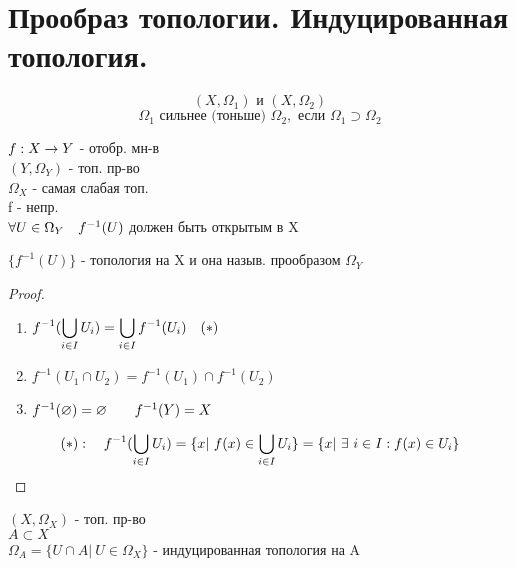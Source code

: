 \documentclass[geometry.tex]{subfiles}
\begin{document}
  \section{Прообраз топологии. Индуцированная топология.}

    \begin{Definition}
        \[(X, \Omega_1) \text{ и } (X, \Omega_2)\]
        \[\Omega_1 \text{ сильнее (тоньше) } \Omega_2, \text{ если } 
        \Omega_1 \supset \Omega_2\]
    \end{Definition}

  \begin{definition}
      $f: X \rightarrow Y$ - отобр. мн-в\\
      $(Y, \Omega_Y)$ - топ. пр-во\\
      $\Omega_X$ - самая слабая топ.\\
      f - непр.\\
      $\forall U \in \Omega_Y \quad f^{-1}(U)$ должен быть открытым в X
  \end{definition}
  \begin{theorem}
      $\{f^{-1}(U)\}$ - топология на X и она назыв. прообразом $\Omega_Y$
  \end{theorem}

  \begin{proof}
      \begin{enumerate}
          \item $\displaystyle f^{-1}(\bigcup_{i \in I} U_i) = \bigcup_{i \in I} f^{-1}(U_i) \quad (*)$
          \item $f^{-1}(U_1 \cap U_2) = f^{-1}(U_1) \cap f^{-1}(U_2)$
          \item $f^{-1}(\varnothing) = \varnothing \quad\quad f^{-1}(Y) = X$
      \end{enumerate}
      \[(*): \quad f^{-1}(\bigcup_{i \in I} U_i) = \{x | \ f(x) \in \bigcup_{i \in I} U_i\} =
      \{x | \ \exists \  i \in I: f(x) \in U_i\}\]
  \end{proof}

  \begin{definition}
      $(X, \Omega_X)$ - топ. пр-во\\
      $A \subset X$\\
      $\Omega_A = \{U \cap A | \ U \in \Omega_X\}$ - индуцированная топология на A
  \end{definition}
\end{document}
